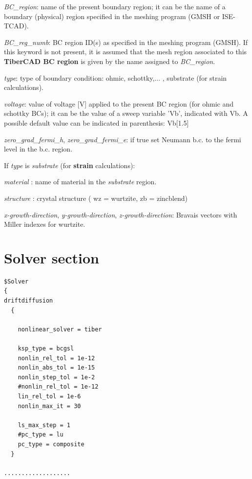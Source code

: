 
\textit{BC\_region}: name of the  present boundary  region; it  can  be  the  name  of a boundary (physical) region    specified in the meshing  program (GMSH or  ISE-TCAD). 

\textit{ BC\_reg\_numb}:  BC region ID(s) as  specified in the meshing  program (GMSH). If  this  keyword  is  not  present, it  is  assumed  that the  mesh region associated to  this  \textbf{TiberCAD BC region} is  given by the  name assigned  to   \textit{BC\_region}.

\textit{ type}: type of  boundary condition: ohmic,  schottky,...  ,  substrate (for strain calculations).

\textit{ voltage}:  value of voltage [V] applied to the present BC region (for ohmic and  schottky BCs); it can be the  value of a sweep  variable 'Vb', indicated with  Vb. A possible default value can be indicated in parenthesis:  Vb[1.5]

\textit{ zero\_grad\_fermi\_h}, \textit{ zero\_grad\_fermi\_e}: if true set  Neumann b.c. to the fermi level in the b.c. region.

If \textit{type} is \textsl{substrate} (for \textbf{strain} calculations):

\textit{material} : name of  material in the \textsl{substrate}  region. 

\textit{structure} : crystal structure ( wz = wurtzite,  zb =  zincblend)

\textit{x-growth-direction}, \textit{y-growth-direction}, \textit{z-growth-direction}: Bravais  vectors with Miller  indexes for  wurtzite.




\section{Solver section }

\label{section:solver}

\begin{inputfile}
\begin{verbatim}
$Solver
{ 
driftdiffusion
  {

    nonlinear_solver = tiber

    ksp_type = bcgsl
    nonlin_rel_tol = 1e-12
    nonlin_abs_tol = 1e-15
    nonlin_step_tol = 1e-2
    #nonlin_rel_tol = 1e-12
    lin_rel_tol = 1e-6
    nonlin_max_it = 30
    
    ls_max_step = 1
    #pc_type = lu
    pc_type = composite
  }

...................

\end{verbatim}
\end{inputfile}


